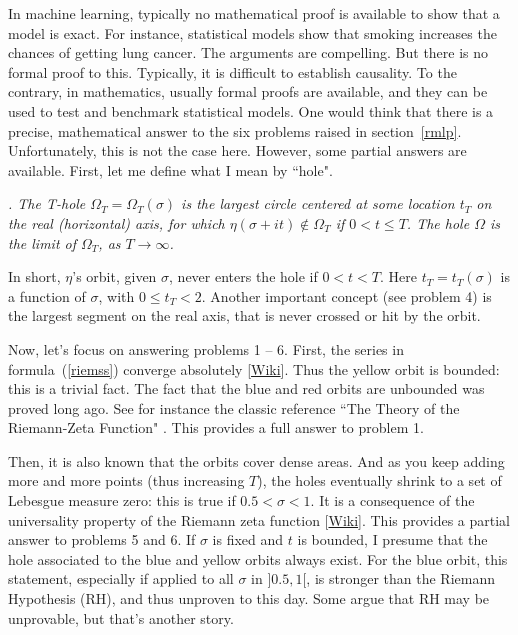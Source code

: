 \documentclass[oneside,10pt]{book}
\begin{document}
In machine learning, typically no mathematical proof is available to show that a model is exact. For instance, statistical models show that smoking increases the chances of getting lung cancer. The arguments are compelling. But there is no formal proof to this. Typically, it is difficult to establish causality. To the contrary, in mathematics, usually formal proofs are
available, and they can be used to test and benchmark statistical models. One would think that there is a precise, mathematical answer to the six problems raised in section~\ref{rmlp}. Unfortunately, this is not the case here. However, some partial answers are available.
First, let me define what I mean by ``hole".


{\em {}.  The T-hole $\Omega_T
=\Omega_T(\sigma)$ is the largest circle centered at some location
$t_T$ on the real (horizontal) axis, for which $\eta(\sigma +it)\notin \Omega_T$ if $0< t\leq T$. The hole $\Omega$ is the limit of $\Omega_T$, as $T\rightarrow \infty$.
}


\noindent In short, $\eta$'s orbit, given $\sigma$, never enters the hole if $0<t<T$. Here $t_T=t_T(\sigma)$ is a function of $\sigma$, with $0\leq t_T < 2$.
Another important concept (see problem 4) is the largest segment on the real axis, that is never crossed or hit by the orbit.

Now, let's focus on answering problems 1 -- 6. First, the series in formula~(\ref{riemss})  converge absolutely [\href{https://en.wikipedia.org/wiki/Absolute_convergence}{Wiki}]. Thus the yellow orbit is bounded: this is a trivial fact.  The fact that the blue and red orbits are unbounded was proved long ago. See for instance the classic reference ``The Theory
 of the Riemann-Zeta Function"  \cite{tdr1987}. This provides a full answer to problem 1.

Then, it is also known that the orbits cover dense areas. And as you keep adding more and more points (thus increasing $T$), the holes eventually shrink to a set of Lebesgue measure zero: this is true if $0.5 < \sigma < 1$. It is a consequence of the universality property of the Riemann zeta function [\href{https://en.wikipedia.org/wiki/Zeta_function_universality}{Wiki}]. This provides a partial answer to problems 5 and 6.
If $\sigma$ is fixed and $t$ is bounded, I presume that the hole associated to the blue and yellow orbits always exist. For the blue orbit,
this statement, especially if applied to all $\sigma$ in $]0.5, 1[$,  is stronger than the Riemann Hypothesis (RH), and thus unproven to this day. Some argue that RH may be unprovable, but that's another story.
\end{document}
